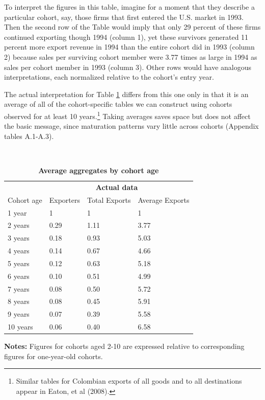 \documentclass[12pt]{article}
\begin{document}
To interpret the figures in this table, imagine for a moment that they
describe a particular cohort, say, those firms that first entered the U.S.
market in 1993. Then the second row of the Table would imply that only 29
percent of these firms continued exporting though 1994 (column 1), yet these
survivors generated 11 percent more export revenue in 1994 than the entire
cohort did in 1993 (column 2) because sales per surviving cohort member were
3.77 times as large in 1994 as sales per cohort member in 1993 (column 3).
Other rows would have analogous interpretations, each normalized relative to
the cohort's entry year.

The actual interpretation for Table \ref{tab:Brooks} differs from this one
only in that it is an average of all of the cohort-specific tables we can
construct using cohorts observed for at least 10 years.\footnote{%
Similar tables for Colombian exports of all goods and to all destinations
appear in Eaton, et al (2008).\medskip \medskip} Taking averages saves space
but does not affect the basic message, since maturation patterns vary little
across cohorts (Appendix tables A.1-A.3). 
\begin{table}[tbp]
\caption{\textbf{Average aggregates by cohort age}}
\label{tab:Brooks}\centering
{\small \ }
\par
{\small 
\begin{tabular}{llll}
\hline\hline
& \multicolumn{3}{l}{\ \ \ \ \ \ \ \ \ \ \ \ \ \textbf{Actual data}} \\ 
\cline{2-4}
Cohort age & Exporters & Total Exports & Average Exports \\ \hline
1 year & 1 & 1 & 1 \\ 
2 years & 0.29 & 1.11 & 3.77 \\ 
3 years & 0.18 & 0.93 & 5.03 \\ 
4 years & 0.14 & 0.67 & 4.66 \\ 
5 years & 0.12 & 0.63 & 5.18 \\ 
6 years & 0.10 & 0.51 & 4.99 \\ 
7 years & 0.08 & 0.50 & 5.72 \\ 
8 years & 0.08 & 0.45 & 5.91 \\ 
9 years & 0.07 & 0.39 & 5.58 \\ 
10 years & 0.06 & 0.40 & 6.58 \\ \hline
\end{tabular}
}
\par
{\endcenter
\begin{tablenotes}
\item \textbf{Notes:} Figures for cohorts aged 2-10 are expressed relative to corresponding figures for one-year-old cohorts. 
\end{tablenotes}
}
\end{table}
\end{document}
